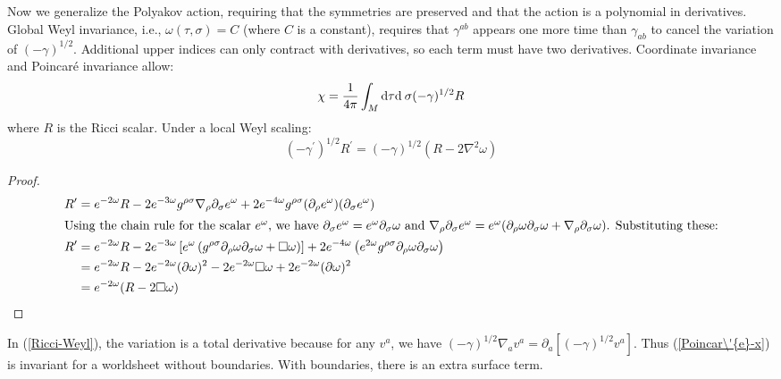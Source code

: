 Now we generalize the Polyakov action, requiring that the symmetries are preserved and that the action is a polynomial in derivatives. 
Global Weyl invariance, i.e., $\omega(\tau, \sigma)=C$ (where $C$ is a constant), requires that $\gamma^{ab}$ appears one more time than $\gamma_{ab}$ to cancel the variation of $(-\gamma)^{1/2}$. Additional upper indices can only contract with derivatives, so each term must have two derivatives. 
Coordinate invariance and Poincaré invariance allow: 
\begin{equation}
	\chi=\frac{1}{4 \pi} \int_{M} \dif \tau \dif \:\sigma(-\gamma)^{1 / 2} R \label{Poincar\'{e}-x}
\end{equation}
where $R$ is the Ricci scalar. 
Under a local Weyl scaling: 
\begin{equation}
	\left(-\gamma^{\prime}\right)^{1 / 2} R^{\prime}=(-\gamma)^{1 / 2}\left(R-2 \nabla^{2} \omega\right)\label{Ricci-Weyl}
\end{equation}
\begin{tcolorbox}[breakable]
	\begin{proof}
		\begin{align*}
			R^\prime &= e^{-2\omega} R - 2 e^{-3\omega} g^{\rho\sigma} \nabla_{\rho} \partial_{\sigma} e^{\omega} + 2 e^{-4\omega} g^{\rho\sigma} (\partial_{\rho} e^{\omega})(\partial_{\sigma} e^{\omega}) \\
			\intertext{Using the chain rule for the scalar $e^{\omega}$, we have $\partial_{\sigma} e^{\omega} = e^{\omega} \partial_{\sigma} \omega$ and $\nabla_{\rho} \partial_{\sigma} e^{\omega} = e^{\omega} (\partial_{\rho} \omega \partial_{\sigma} \omega + \nabla_{\rho} \partial_{\sigma} \omega)$. Substituting these:}
			R^\prime &= e^{-2\omega} R - 2 e^{-3\omega} \left[ e^{\omega} \left( g^{\rho\sigma} \partial_{\rho} \omega \partial_{\sigma} \omega + \square \omega \right) \right] + 2 e^{-4\omega} \left( e^{2\omega} g^{\rho\sigma} \partial_{\rho} \omega \partial_{\sigma} \omega \right) \\
			&= e^{-2\omega} R - 2 e^{-2\omega} (\partial \omega)^2 - 2 e^{-2\omega} \square \omega + 2 e^{-2\omega} (\partial \omega)^2 \\
			&= e^{-2\omega} (R - 2 \square \omega)
		\end{align*}
	\end{proof}
\end{tcolorbox} 
\noindent In (\ref{Ricci-Weyl}), the variation is a total derivative because for any $v^a$, we have $(-\gamma)^{1/2}\nabla_a v^a=\partial_a[(-\gamma)^{1/2}v^a]$. Thus (\ref{Poincar\'{e}-x}) is invariant for a worldsheet without boundaries. With boundaries, there is an extra surface term. 

